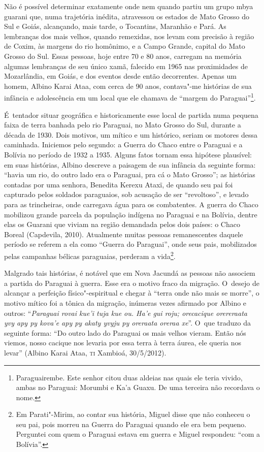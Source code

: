 Não é possível determinar exatamente onde nem quando partiu um grupo
mbya guarani que, numa trajetória inédita, atravessou os estados de
Mato Grosso do Sul e Goiás, alcançando, mais tarde, o Tocantins,
Maranhão e Pará. As lembranças dos mais velhos, quando remexidas, nos
levam com precisão à região de Coxim, às margens do rio homônimo, e a
Campo Grande, capital do Mato Grosso do Sul. Essas pessoas, hoje entre
70 e 80 anos, carregam na memória algumas lembranças de seu único xamã,
falecido em 1965 nas proximidades de Mozarlândia, em Goiás, e
dos eventos desde então decorrentes. Apenas um homem, Albino Karai
Ataa, com cerca de 90 anos, contava"-me histórias de sua
infância e adolescência em um local que ele chamava de ``margem do
Paraguai''\footnote{Paraguairembe. Este senhor citou duas aldeias nas
quais ele teria vivido, ambas no Paraguai: Morumbi e Ka’a Guaxu. De uma
terceira não recordava o nome.}. 

É~tentador situar geográfica e historicamente esse local de partida numa
pequena faixa de terra banhada pelo rio Paraguai, no Mato Grosso do
Sul, durante a década de 1930. Dois motivos, um mítico e um histórico,
seriam os motores dessa caminhada. Iniciemos pelo segundo: a Guerra do
Chaco entre o Paraguai e a Bolívia no período de 1932 a 1935. Alguns
fatos tornam essa hipótese plausível: em suas histórias, Albino
descreve a paisagem de sua infância da seguinte forma: ``havia um rio,
do outro lado era o Paraguai, pra cá o Mato Grosso''; as histórias
contadas por uma senhora, Benedita Kerexu Ataxï, de quando seu pai foi
capturado pelos soldados paraguaios, sob acusação de ser ``revoltoso'', e
levado para as trincheiras, onde carregava água para os combatentes. A
guerra do Chaco mobilizou grande parcela da população indígena no
Paraguai e na Bolívia, dentre elas os Guarani que viviam na região
demandada pelos dois países: o Chaco Boreal (Capdevila, 2010).
Atualmente muitas pessoas remanescentes daquele período se referem a
ela como ``Guerra do Paraguai'', onde seus pais, mobilizados pelas
campanhas bélicas paraguaias, perderam a vida\footnote{Em Parati"-Mirim,
ao contar sua história, Miguel disse que não conheceu o seu pai, pois
morreu na Guerra do Paraguai quando ele era bem pequeno. Perguntei com
quem o Paraguai estava em guerra e Miguel respondeu: ``com a Bolívia''.}.

Malgrado tais histórias, é notável que em Nova Jacundá as pessoas não
associem a partida do Paraguai à guerra. Esse era o motivo fraco da
migração. O~desejo de alcançar a perfeição físico"-espiritual e chegar à
``terra onde não mais se morre'', o motivo mítico foi a tônica da
migração, inúmeras vezes afirmado por Albino e outros: ``\emph{Paraguai rovai
kue’i tuja kue ou. Ha’e gui roju; orecacique orereraata yvy apy py
kova’e apy py akaty yvyju py oreraata oreraa xe}''. O~que traduzo da
seguinte forma: ``Do outro lado do Paraguai os mais velhos vieram. Então
nós viemos, nosso cacique nos levaria por essa terra à terra áurea, ele
queria nos levar'' (Albino Karai Ataa, \textsc{ti} Xambioá, 30/5/2012).

